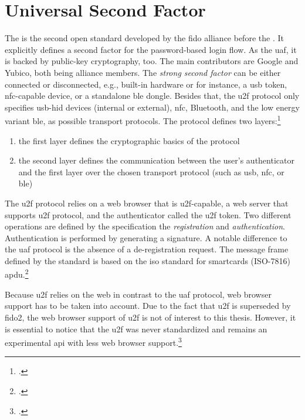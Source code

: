\section{Universal Second Factor}
\label{mfa:u2f}

The  is the second open standard developed by the \gls{fido} alliance before the \wa. It explicitly defines a second factor for the password-based login flow. As the \gls{uaf}, it is backed by public-key cryptography, too. The main contributors are Google and Yubico, both being alliance members. The \textit{strong second factor} can be either connected or disconnected, e.g., built-in hardware or for instance, a \gls{usb} token, \gls{nfc}-capable device, or a standalone \gls{ble} dongle. Besides that, the \gls{u2f} protocol only specifies \gls{usb}-\gls{hid} devices (internal or external), \gls{nfc}, Bluetooth, and the low energy variant \gls{ble}, as possible transport protocols. The protocol defines two layers:\footcites[See][4]{u2f-overview}[See][4]{u2f-js-api}

\begin{enumerate}
	\item the first layer defines the cryptographic basics of the protocol
	\item the second layer defines the communication between the user's authenticator and the first layer over the chosen transport protocol (such as \gls{usb}, \gls{nfc}, or \gls{ble})
\end{enumerate}

The \gls{u2f} protocol relies on a web browser that is \gls{u2f}-capable, a web server that supports \gls{u2f} protocol, and the authenticator called the \gls{u2f} token. Two different operations are defined by the specification the \textit{registration} and \textit{authentication}. Authentication is performed by generating a signature. A notable difference to the \gls{uaf} protocol is the absence of a de-registration request. The message frame defined by the standard is based on the \gls{iso} standard for smartcards (ISO-7816) \gls{apdu}.\footcites[See][3]{7860546}[See][3]{u2f-raw-message}

Because \gls{u2f} relies on the web in contrast to the \gls{uaf} protocol, web browser support has to be taken into account. Due to the fact that \gls{u2f} is superseded by \gls{fido}2, the web browser support of \gls{u2f} is not of interest to this thesis. However, it is essential to notice that the \gls{u2f} was never standardized and remains an experimental \gls{api} with less web browser support.\footcites[See][31]{fido-ct-5}

